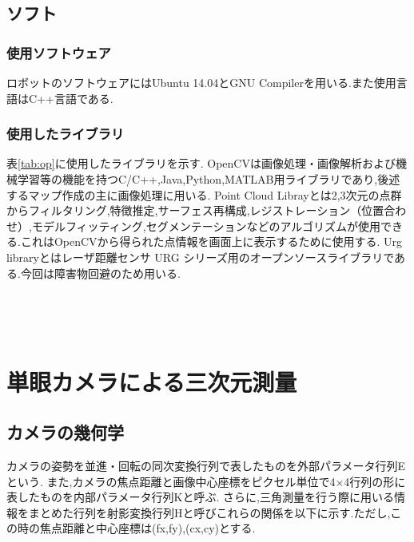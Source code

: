 \documentclass[12pt,oneside]{sotsuken_paper}
\begin{document}
\section{ソフト}
\subsection{使用ソフトウェア} 
ロボットのソフトウェアにはUbuntu 14.04とGNU Compilerを用いる.また使用言語はC++言語である. 

\subsection{使用したライブラリ} 
表\ref{tab:op}に使用したライブラリを示す. OpenCVは画像処理・画像解析および機械学習等の機能を持つC/C++,Java,Python,MATLAB用ライブラリであり,後述するマップ作成の主に画像処理に用いる. Point Cloud Librayとは2,3次元の点群からフィルタリング,特徴推定,サーフェス再構成,レジストレーション（位置合わせ）,モデルフィッティング,セグメンテーションなどのアルゴリズムが使用できる.これはOpenCVから得られた点情報を画面上に表示するために使用する. Urg libraryとはレーザ距離センサ URG シリーズ用のオープンソースライブラリである.今回は障害物回避のため用いる. 
\begin{table}[h] 
 　\begin{center} 
    \caption{使用したライブラリ} 
    \small 
　   \label{tab:op} 
  \end{center} 
\end{table}

\chapter{単眼カメラによる三次元測量}
\section{カメラの幾何学}
カメラの姿勢を並進・回転の同次変換行列で表したものを外部パラメータ行列Eという.
また,カメラの焦点距離と画像中心座標をピクセル単位で4×4行列の形に表したものを内部パラメータ行列Kと呼ぶ.
さらに,三角測量を行う際に用いる情報をまとめた行列を射影変換行列Hと呼びこれらの関係を以下に示す.ただし,この時の焦点距離と中心座標は(fx,fy),(cx,cy)とする.
\end{document}
